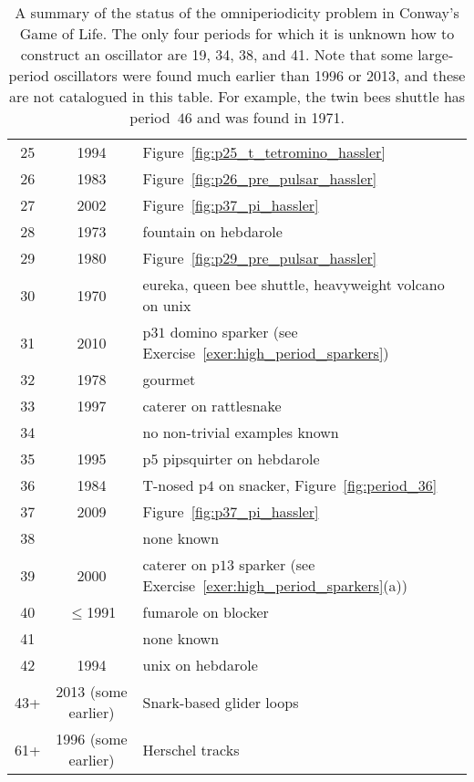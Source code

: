 \begin{table}[!htb]
\begin{center}
\begin{tabular}{c c l}
			\rowcolor{gray!20} 25 & 1994 & Figure~\ref{fig:p25_t_tetromino_hassler} \\
			26 & 1983 & Figure~\ref{fig:p26_pre_pulsar_hassler} \\
			\rowcolor{gray!20} 27 & 2002 & Figure~\ref{fig:p37_pi_hassler} \\
			28 & 1973 & fountain on hebdarole \\
			\rowcolor{gray!20} 29 & 1980 & Figure~\ref{fig:p29_pre_pulsar_hassler} \\
			30 & 1970 & eureka, queen bee shuttle, heavyweight volcano on unix \\
			\rowcolor{gray!20} 31 & 2010 & p$31$ domino sparker (see Exercise~\ref{exer:high_period_sparkers})\\
			32 & 1978 & gourmet \\
			\rowcolor{gray!20} 33 & 1997 & caterer on rattlesnake \\
			\rowcolor{redback!50} 34 & & no non-trivial examples known \\
			\rowcolor{gray!20} 35 & 1995 & p$5$ pipsquirter on hebdarole \\
			36 & 1984 & T-nosed p$4$ on snacker, Figure~\ref{fig:period_36} \\
			\rowcolor{gray!20} 37 & 2009 & Figure~\ref{fig:p37_pi_hassler} \\
			\rowcolor{redback!50} 38 & & none known \\
			\rowcolor{gray!20} 39 & 2000 & caterer on p$13$ sparker (see Exercise~\ref{exer:high_period_sparkers}(a)) \\
			40 & $\leq$1991 & fumarole on blocker \\
			\rowcolor{redback!50} 41 & & none known \\
			42 & 1994 & unix on hebdarole \\
			\rowcolor{gray!20} 43+ & 2013 (some earlier) & Snark-based glider loops \\
			61+ & 1996 (some earlier) & Herschel tracks \\\bottomrule
		\end{tabular}
		\caption{A summary of the status of the omniperiodicity problem in Conway's Game of Life. The only four periods for which it is unknown how to construct an oscillator are 19, 34, 38, and 41. Note that some large-period oscillators were found much earlier than 1996 or 2013, and these are not catalogued in this table. For example, the twin bees shuttle has period~$46$ and was found in 1971.}\label{tab:omniperiodic}
	\end{center}
\end{table}

